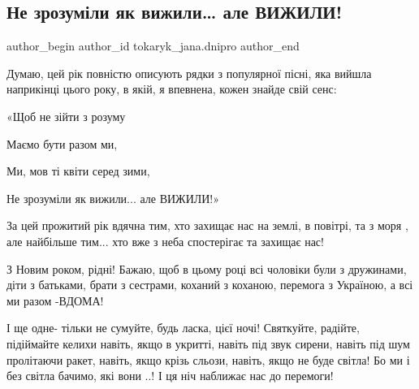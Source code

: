  
 
 
 
 

\subsection{Не зрозуміли як вижили… але ВИЖИЛИ!}
\label{sec:31_12_2022.fb.tokaryk_jana.dnipro.1.ne_zrozum_li_yak_viz}

\ifcmt
 author_begin
   author_id tokaryk_jana.dnipro
 author_end
\fi

Думаю, цей рік повністю  описують рядки з популярної пісні, яка вийшла
наприкінці цього  року, в якій, я впевнена, кожен знайде свій сенс:

«Щоб не зійти з розуму 

Маємо бути разом ми, 

Ми, мов ті квіти серед зими, 

Не зрозуміли як вижили... але ВИЖИЛИ!»

За цей прожитий рік вдячна тим, хто захищає нас на землі, в повітрі, та з моря
, але найбільше тим... хто вже з неба спостерігає та захищає нас!

З Новим роком, рідні! Бажаю, щоб в цьому році всі чоловіки були з дружинами,
діти з батьками, брати з сестрами, коханий з коханою, перемога з Україною, а
всі ми разом -ВДОМА!

І ще одне- тільки не сумуйте, будь ласка, цієї ночі! Святкуйте, радійте,
підіймайте келихи навіть, якщо  в укритті, навіть під звук сирени, навіть під
шум пролітаючи ракет, навіть, якщо крізь сльози, навіть, якщо не буде світла!
Бо ми і без світла бачимо, які вони ..! І ця ніч наближає нас до перемоги!
